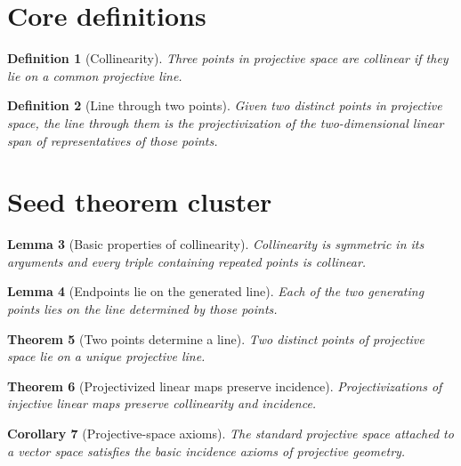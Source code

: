 \documentclass[11pt]{article}
\newtheorem{definition}{Definition}[section]
\newtheorem{lemma}[definition]{Lemma}
\newtheorem{theorem}[definition]{Theorem}
\newtheorem{corollary}[definition]{Corollary}
\begin{document}
\section{Core definitions}

\begin{definition}[Collinearity]\label{def:collinearity}
Three points in projective space are collinear if they lie on a common
projective line.
\end{definition}

\begin{definition}[Line through two points]\label{def:line-through-two-points}
Given two distinct points in projective space, the line through them is the
projectivization of the two-dimensional linear span of representatives of those
points.
\end{definition}

\section{Seed theorem cluster}

\begin{lemma}[Basic properties of collinearity]
\label{lem:basic-properties-of-collinearity}
Collinearity is symmetric in its arguments and every triple containing repeated
points is collinear.
\end{lemma}

\begin{lemma}[Endpoints lie on the generated line]
\label{lem:endpoints-lie-on-generated-line}
Each of the two generating points lies on the line determined by those points.
\end{lemma}

\begin{theorem}[Two points determine a line]\label{thm:two-points-determine-a-line}
Two distinct points of projective space lie on a unique projective line.
\end{theorem}

\begin{theorem}[Projectivized linear maps preserve incidence]
\label{thm:projectivized-linear-maps-preserve-incidence}
Projectivizations of injective linear maps preserve collinearity and incidence.
\end{theorem}

\begin{corollary}[Projective-space axioms]\label{cor:projective-space-axioms}
The standard projective space attached to a vector space satisfies the basic
incidence axioms of projective geometry.
\end{corollary}
\end{document}
